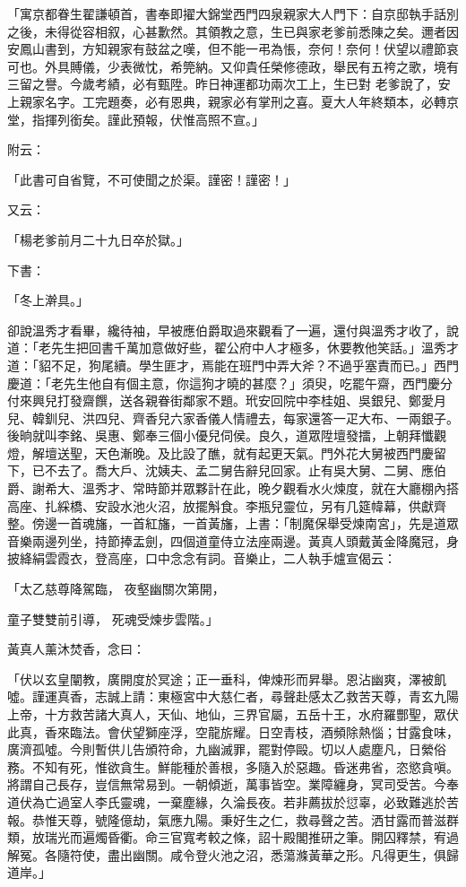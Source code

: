 「寓京都眷生翟謙頓首，書奉即擢大錦堂西門四泉親家大人門下：自京邸執手話別之後，未得從容相叙，心甚歉然。其領教之意，生已與家老爹前悉陳之矣。邇者因安鳳山書到，方知親家有鼓盆之嘆，但不能一弔為悵，奈何！奈何！伏望以禮節哀可也。外具賻儀，少表微忱，希筦納。又仰貴任榮修德政，舉民有五袴之歌，境有三留之譽。今歲考績，必有甄陞。昨日神運都功兩次工上，生已對 老爹說了，安上親家名字。工完題奏，必有恩典，親家必有掌刑之喜。夏大人年終類本，必轉京堂，指揮列銜矣。謹此預報，伏惟高照不宣。」

附云：

「此書可自省覽，不可使聞之於渠。謹密！謹密！」

又云：

「楊老爹前月二十九日卒於獄。」

下書：

「冬上澣具。」

卻說溫秀才看畢，纔待袖，早被應伯爵取過來觀看了一遍，還付與溫秀才收了，說道：「老先生把回書千萬加意做好些，翟公府中人才極多，休要教他笑話。」溫秀才道：「貂不足，狗尾續。學生匪才，焉能在班門中弄大斧？不過乎塞責而已。」西門慶道：「老先生他自有個主意，你這狗才曉的甚麼？」須臾，吃罷午齋，西門慶分付來興兒打發齋饌，送各親眷街鄰家不題。玳安回院中李桂姐、吳銀兒、鄭愛月兒、韓釧兒、洪四兒、齊香兒六家香儀人情禮去，每家還答一疋大布、一兩銀子。後晌就叫李銘、吳惠、鄭奉三個小優兒伺侯。良久，道眾陞壇發擂，上朝拜懺觀燈，解壇送聖，天色漸晚。及比設了醮，就有起更天氣。門外花大舅被西門慶留下，已不去了。喬大戶、沈姨夫、孟二舅告辭兒回家。止有吳大舅、二舅、應伯爵、謝希大、溫秀才、常時節并眾夥計在此，晚夕觀看水火煉度，就在大廳棚內搭高座、扎綵橋、安設水池火沼，放擺斛食。李瓶兒靈位，另有几筵幃幕，供獻齊整。傍邊一首魂旛，一首紅旛，一首黃旛，上書：「制魔保舉受煉南宮」，先是道眾音樂兩邊列坐，持節捧盂劍，四個道童侍立法座兩邊。黃真人頭戴黃金降魔冠，身披絳絹雲霞衣，登高座，口中念念有詞。音樂止，二人執手爐宣偈云：

「太乙慈尊降駕臨，  夜壑幽關次第開，

童子雙雙前引導，  死魂受煉步雲階。」

黃真人薰沐焚香，念曰：

「伏以玄皇闡教，廣開度於冥途；正一垂科，俾煉形而昇舉。恩沾幽爽，澤被飢噓。謹運真香，志誠上請：東極宮中大慈仁者，尋聲赴感太乙救苦天尊，青玄九陽上帝，十方救苦諸大真人，天仙、地仙，三界官屬，五岳十王，水府羅酆聖，眾伏此真，香來臨法。會伏望獅座浮，空龍旂耀。日空青枝，酒頻除熱惱；甘露食味，廣濟孤噓。今則暫供儿告頒符命，九幽滅罪，罷對停毆。切以人處塵凡，日縈俗務。不知有死，惟欲貪生。鮮能種於善根，多隨入於惡趣。昏迷弗省，恣慾貪嗔。將謂自己長存，豈信無常易到。一朝傾逝，萬事皆空。業障纏身，冥司受苦。今奉道伏為亡過室人李氏靈魂，一棄塵緣，久淪長夜。若非薦拔於愆辜，必致難逃於苦報。恭惟天尊，號隆億劫，氣應九陽。秉好生之仁，救尋聲之苦。洒甘露而普滋群類，放瑞光而遍燭昏衢。命三官寬考較之條，詔十殿閣推研之筆。開囚釋禁，宥過解冤。各隨符使，盡出幽關。咸令登火池之沼，悉蕩滌黃華之形。凡得更生，俱歸道岸。」

